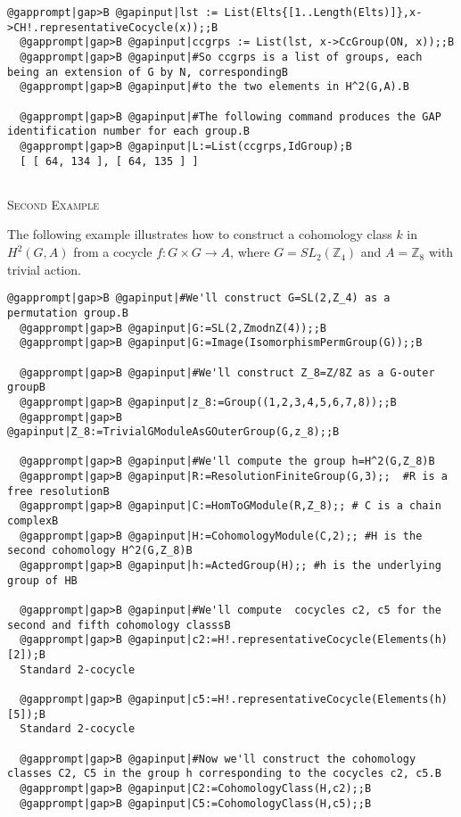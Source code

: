 \documentclass[a4paper,11pt]{report}
\begin{document}
{{\begin{Verbatim}[commandchars=@|B,fontsize=\small,frame=single,label=Example]
  @gapprompt|gap>B @gapinput|lst := List(Elts{[1..Length(Elts)]},x->CH!.representativeCocycle(x));;B
  @gapprompt|gap>B @gapinput|ccgrps := List(lst, x->CcGroup(ON, x));;B
  @gapprompt|gap>B @gapinput|#So ccgrps is a list of groups, each being an extension of G by N, correspondingB
  @gapprompt|gap>B @gapinput|#to the two elements in H^2(G,A).B
  
  @gapprompt|gap>B @gapinput|#The following command produces the GAP identification number for each group.B
  @gapprompt|gap>B @gapinput|L:=List(ccgrps,IdGroup);B
  [ [ 64, 134 ], [ 64, 135 ] ]
  
\end{Verbatim}
 

\textsc{Second Example} 

The following example illustrates how to construct a cohomology class $k$ in $H^2(G, A)$ from a cocycle $f:G \times G \rightarrow A$, where $G=SL_2(\mathbb Z_4)$ and $A=\mathbb Z_8$ with trivial action. 
\begin{Verbatim}[commandchars=@|B,fontsize=\small,frame=single,label=Example]
  @gapprompt|gap>B @gapinput|#We'll construct G=SL(2,Z_4) as a permutation group.B
  @gapprompt|gap>B @gapinput|G:=SL(2,ZmodnZ(4));;B
  @gapprompt|gap>B @gapinput|G:=Image(IsomorphismPermGroup(G));;B
  
  @gapprompt|gap>B @gapinput|#We'll construct Z_8=Z/8Z as a G-outer groupB
  @gapprompt|gap>B @gapinput|z_8:=Group((1,2,3,4,5,6,7,8));;B
  @gapprompt|gap>B @gapinput|Z_8:=TrivialGModuleAsGOuterGroup(G,z_8);;B
  
  @gapprompt|gap>B @gapinput|#We'll compute the group h=H^2(G,Z_8)B
  @gapprompt|gap>B @gapinput|R:=ResolutionFiniteGroup(G,3);;  #R is a free resolutionB
  @gapprompt|gap>B @gapinput|C:=HomToGModule(R,Z_8);; # C is a chain complexB
  @gapprompt|gap>B @gapinput|H:=CohomologyModule(C,2);; #H is the second cohomology H^2(G,Z_8)B
  @gapprompt|gap>B @gapinput|h:=ActedGroup(H);; #h is the underlying group of HB
  
  @gapprompt|gap>B @gapinput|#We'll compute  cocycles c2, c5 for the second and fifth cohomology classsB
  @gapprompt|gap>B @gapinput|c2:=H!.representativeCocycle(Elements(h)[2]);B
  Standard 2-cocycle 
  
  @gapprompt|gap>B @gapinput|c5:=H!.representativeCocycle(Elements(h)[5]);B
  Standard 2-cocycle 
  
  @gapprompt|gap>B @gapinput|#Now we'll construct the cohomology classes C2, C5 in the group h corresponding to the cocycles c2, c5.B
  @gapprompt|gap>B @gapinput|C2:=CohomologyClass(H,c2);;B
  @gapprompt|gap>B @gapinput|C5:=CohomologyClass(H,c5);;B
   

\end{Verbatim}}}
\end{document}

